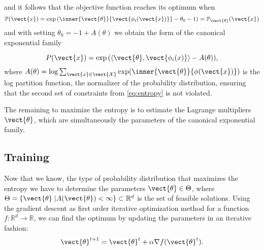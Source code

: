     and it follows that the objective function reaches its optimum when 
    \begin{equation}   
        \mathbb{P}(\vect{x}) = \exp{(\inner{\vect{\theta}}{\vect{\phi_i(\vect{x})}} - \theta_0 - 1)} = \mathbb{P}_{\vect{\theta}}(\vect{x})
    \end{equation} 
    and with setting $\theta_0 = -1 + A(\theta) $ we obtain the form of the canonical exponential family

    \begin{equation}
        P(\vect{x}) = \exp{(\langle\vect{\theta}, \vect{\phi_i(x)} \rangle - A(\theta))},
    \end{equation}
    where $A(\theta) = \log \sum_{\vect{x}\in \vect{\mathcal{X}}} \exp(\inner{\vect{\theta}}{\phi(\vect{x})})$ is the log partition function, the normalizer of the probability distribution, ensuring that the second set of constraints from \eq\ref{eq:entropy} is not violated.
    
    The remaining to maximize the entropy is to estimate the Lagrange multipliers $\vect{\theta}$, which are simultaneously the parameters of the canonical exponential family.

    \subsection{Training}
    \label{ssec:train}

    Now that we know, the type of  probability distribution that maximizes the entropy we have to determine the parameters $\vect{\theta} \in \Theta$, where $\Theta = \{\vect{\theta} \;\lvert A(\vect{\theta}) < \infty\} \subset \mathbb{R}^d$ is the set of feasible solutions.
    Using the gradient descent as first order iterative optimization method for a function $f: \mathbb{R}^d \rightarrow \mathbb{R}$, we can find the optimum by updating the parameters in an iterative fashion:
    \begin{equation}
        \label{eq:gradesc}
        \vect{\theta}^{t+1} = \vect{\theta}^{t} + \alpha \nabla f(\vect{\theta}^{t}).
    \end{equation}

